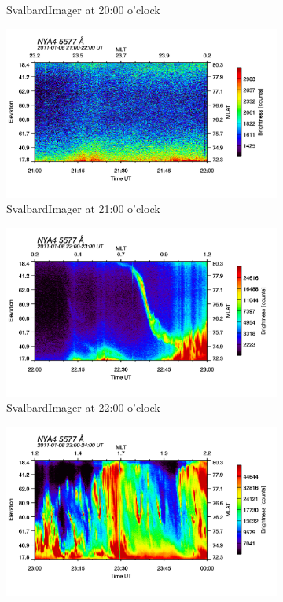 \documentclass[10pt,a4paper]{article}
\begin{document}
\begin{figure}[h]
\begin{subfigure}{0.3\textwidth}
	\caption{ SvalbardImager at 20:00 o'clock \label{SBI_5_20}}
\end{subfigure}
\begin{subfigure}{0.3\textwidth}
\centering
	\includegraphics[width=\textwidth]{SvalbardImager5577A21.png}
	\caption{ SvalbardImager at 21:00 o'clock \label{SBI_5_21}}
\end{subfigure}
\begin{subfigure}{0.3\textwidth}
\centering
	\includegraphics[width=\textwidth]{SvalbardImager5577A22.png}
	\caption{ SvalbardImager at 22:00 o'clock \label{SBI_5_22}}
\end{subfigure}
\begin{subfigure}{0.3\textwidth}
\centering
	\includegraphics[width=\textwidth]{SvalbardImager5577A23.png}

\end{subfigure}
\end{figure}
\end{document}
